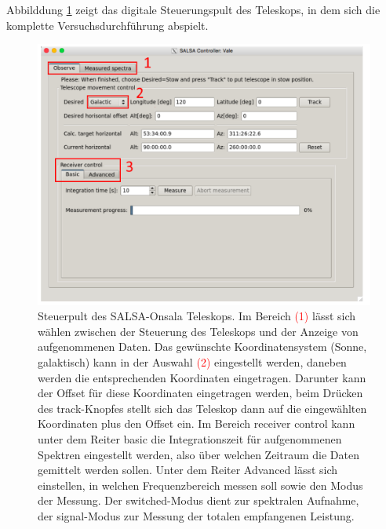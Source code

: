 \documentclass[../main.tex]{subfiles}
\begin{document}
\noindent Abbilddung \ref{fig:AufbauSteuerpult} zeigt das digitale Steuerungspult des Teleskops, in dem sich die komplette Versuchsdurchführung abspielt.  
\begin{figure}[H]
    \centering
    \includegraphics[width=12cm]{Bilddateien/Aufbau/AufbauSteuerpult.png}
    \caption{Steuerpult des SALSA-Onsala Teleskops. Im Bereich \textcolor{red}{(1)} lässt sich wählen zwischen der Steuerung des Teleskops und der Anzeige von aufgenommenen Daten. Das gewünschte Koordinatensystem (Sonne, galaktisch) kann in der Auswahl \textcolor{red}{(2)} eingestellt werden, daneben werden die entsprechenden Koordinaten eingetragen. Darunter kann der Offset für diese Koordinaten eingetragen werden, beim Drücken des \glqq{}track\grqq{}-Knopfes stellt sich das Teleskop dann auf die eingewählten Koordinaten plus den Offset ein. Im Bereich \glqq{}receiver control\grqq{} kann unter dem Reiter \glqq{}basic\grqq{} die Integrationszeit für aufgenommenen Spektren eingestellt werden, also über welchen Zeitraum die Daten gemittelt werden sollen. Unter dem Reiter \glqq{}Advanced\grqq{} lässt sich einstellen, in welchen Frequenzbereich messen soll sowie den Modus der Messung. Der \glqq{}switched\grqq{}-Modus dient zur spektralen Aufnahme, der \glqq{}signal\grqq{}-Modus zur Messung der totalen empfangenen Leistung.}
    \label{fig:AufbauSteuerpult}
\end{figure}
        
\end{document}
